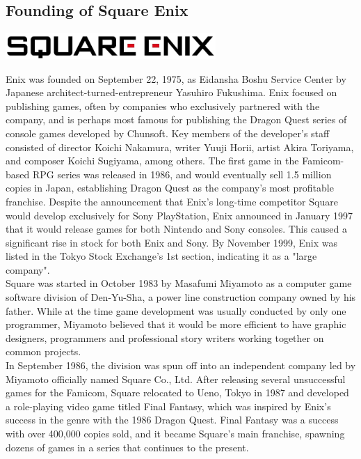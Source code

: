 \documentclass[11pt]{report}
\begin{document}
\subsection{Founding of Square Enix}
\vspace{2mm}\begin{center}\includegraphics[width=8cm]{./img/squareEnixLogo.jpg}\end{center}
Enix was founded on September 22, 1975, as Eidansha Boshu Service Center by Japanese architect-turned-entrepreneur Yasuhiro Fukushima. Enix focused on publishing games, often by companies who exclusively partnered with the company, and is perhaps most famous for publishing the Dragon Quest series of console games developed by Chunsoft. Key members of the developer's staff consisted of director Koichi Nakamura, writer Yuuji Horii, artist Akira Toriyama, and composer Koichi Sugiyama, among others. The first game in the Famicom-based RPG series was released in 1986, and would eventually sell 1.5 million copies in Japan, establishing Dragon Quest as the company's most profitable franchise. Despite the announcement that Enix's long-time competitor Square would develop exclusively for Sony PlayStation, Enix announced in January 1997 that it would release games for both Nintendo and Sony consoles. This caused a significant rise in stock for both Enix and Sony. By November 1999, Enix was listed in the Tokyo Stock Exchange's 1st section, indicating it as a "large company".\\
\indent Square was started in October 1983 by Masafumi Miyamoto as a computer game software division of Den-Yu-Sha, a power line construction company owned by his father. While at the time game development was usually conducted by only one programmer, Miyamoto believed that it would be more efficient to have graphic designers, programmers and professional story writers working together on common projects.\\ \indent In September 1986, the division was spun off into an independent company led by Miyamoto officially named Square Co., Ltd. After releasing several unsuccessful games for the Famicom, Square relocated to Ueno, Tokyo in 1987 and developed a role-playing video game titled Final Fantasy, which was inspired by Enix's success in the genre with the 1986 Dragon Quest. Final Fantasy was a success with over 400,000 copies sold, and it became Square's main franchise, spawning dozens of games in a series that continues to the present.
\end{document}
